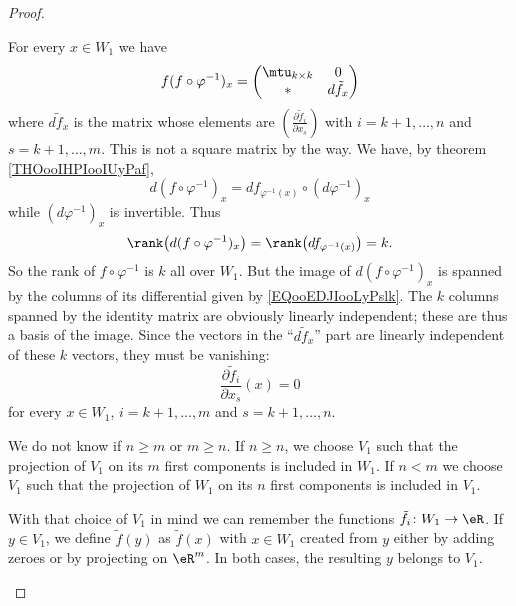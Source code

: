 \begin{proof}
\begin{subproof}
\begin{subproof}
			For every \( x\in W_1\) we have
			\begin{equation}        \label{EQooEDJIooLyPslk}
				f(f\circ \varphi^{-1})_x=\begin{pmatrix}
					\mtu_{k\times k} & 0           \\
					*                & d\tilde f_x
				\end{pmatrix}
			\end{equation}
			where \( d\tilde f_x\) is the matrix whose elements are \( \left( \frac{ \partial \tilde f_i }{ \partial x_s } \right)\) with \( i=k+1,\ldots, n\) and \( s=k+1,\ldots, m\). This is not a square matrix by the way. We have, by theorem \ref{THOooIHPIooIUyPaf},
			\begin{equation}
				d(f\circ\varphi^{-1})_x=df_{\varphi^{-1}(x)}\circ(d\varphi^{-1})_x
			\end{equation}
			while \( (d\varphi^{-1})_x\) is invertible. Thus
			\begin{equation}
				\rank\big( d(f\circ\varphi^{-1})_x \big)=\rank\big( df_{\varphi^{-1}(x)} \big)=k.
			\end{equation}
			So the rank of \( f\circ\varphi^{-1}\) is \( k\) all over \( W_1\). But the image of \( d(f\circ\varphi^{-1})_x\) is spanned by the columns of its differential given by \eqref{EQooEDJIooLyPslk}. The \( k \) columns spanned by the identity matrix are obviously linearly independent; these are thus a basis of the image. Since the vectors in the ``\( d\tilde f_x\)'' part are linearly independent of these \( k\) vectors, they must be vanishing:
			\begin{equation}
				\frac{ \partial \tilde f_i }{ \partial x_s }(x)=0
			\end{equation}
			for every \( x\in W_1\), \( i=k+1,\ldots, m\) and \( s=k+1,\ldots, n\).


			We do not know if \( n\geq m\) or \( m\geq n\). If \( n\geq n\), we choose \( V_1\) such that the projection of \( V_1\) on its \( m\) first components is included in \( W_1\). If \( n<m\) we choose \( V_1\) such that the projection of \( W_1\) on its \( n\) first components is included in \( V_1\).

			With that choice of \( V_1\) in mind we can remember the functions \( \tilde f_i\colon W_1\to \eR\). If \( y\in V_1\), we define \( \tilde f(y)\) as \( \tilde f(x)\) with \( x\in W_1\) created from \( y\) either by adding zeroes or by projecting on \( \eR^m\). In both cases, the resulting \( y\) belongs to \( V_1\).


\end{subproof}
\end{subproof}
\end{proof}
